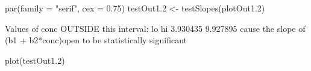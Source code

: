 \begin{Schunk}
\begin{Sinput}
 par(family = "serif", cex = 0.75)
 testOut1.2 <- testSlopes(plotOut1.2)
\end{Sinput}
\begin{Soutput}
Values of conc OUTSIDE this interval:
      lo       hi 
3.930435 9.927895 
cause the slope of (b1 + b2*conc)open to be statistically significant
\end{Soutput}
\begin{Sinput}
 plot(testOut1.2)
\end{Sinput}
\end{Schunk}
